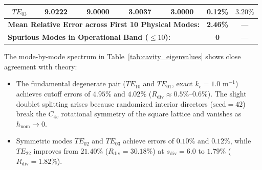 \documentclass[VANCOUVER]{USG}
\begin{document}
\begin{table}[!t]
{\begin{tabular}{ccccccc}
            $TE_{03}$                                                                        & 9.0222                                                    & 9.0000                                                    & 3.0037                                                 & 3.0000                                                 & \textbf{0.12\%}                                 & $3.20\%$                                      \\
            \midrule
            \multicolumn{5}{l}{\textbf{Mean Relative Error across First 10 Physical Modes:}} & \textbf{2.46\%}                                           & ---                                                                                                                                                                                                                                                                           \\
            \multicolumn{5}{l}{\textbf{Spurious Modes in Operational Band ($\le 10$):}}      & \textbf{0}                                                & ---                                                                                                                                                                                                                                                                           \\
            \bottomrule
        \end{tabular}
    }
\end{table}

The mode-by-mode spectrum in Table~\ref{tab:cavity_eigenvalues} shows close agreement with theory:
\begin{itemize}
    \item The fundamental degenerate pair ($TE_{10}$ and $TE_{01}$, exact $k_c = 1.0\text{ m}^{-1}$) achieves cutoff errors of $4.95\%$ and $4.02\%$ ($R_{\mathrm{div}} \approx 0.5\%\text{--}0.6\%$). The slight doublet splitting arises because randomized interior directors ($\text{seed}=42$) break the $C_{4v}$ rotational symmetry of the square lattice and vanishes as $h_{\mathrm{nom}} \to 0$.
    \item Symmetric modes $TE_{02}$ and $TE_{03}$ achieve errors of $0.10\%$ and $0.12\%$, while $TE_{22}$ improves from $21.40\%$ ($R_{\mathrm{div}} = 30.18\%$) at $s_{\mathrm{div}} = 6.0$ to $\mathbf{1.79\%}$ ($R_{\mathrm{div}} = 1.82\%$).
\end{itemize}
\end{document}
